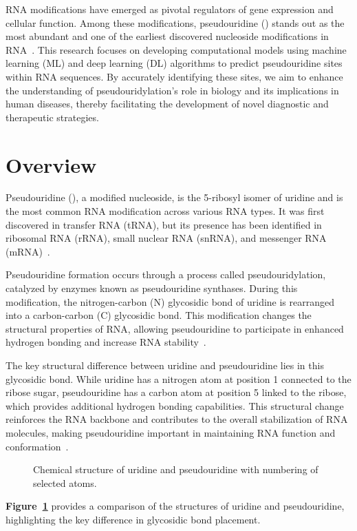 RNA modifications have emerged as pivotal regulators of gene expression and cellular function.
Among these modifications, pseudouridine (\pseudo) stands out as the most abundant and one of the earliest discovered nucleoside modifications in RNA~\cite{charette_pseudouridine_2000}.
This research focuses on developing computational models using machine learning (ML) and deep learning (DL) algorithms to predict pseudouridine sites within RNA sequences.
By accurately identifying these sites, we aim to enhance the understanding of pseudouridylation's role in biology and its implications in human diseases, thereby facilitating the development of novel diagnostic and therapeutic strategies.


\section{Overview}\label{sec:overview}
  Pseudouridine (\pseudo), a modified nucleoside, is the 5-ribosyl isomer of uridine and is the most common RNA modification across various RNA types.
  It was first discovered in transfer RNA (tRNA), but its presence has been identified in ribosomal RNA (rRNA), small nuclear RNA (snRNA), and messenger RNA (mRNA)~\cite{cohn_nucleoside-5-phosphates_1951}.

  Pseudouridine formation occurs through a process called pseudouridylation, catalyzed by enzymes known as pseudouridine synthases.
  During this modification, the nitrogen-carbon (N) glycosidic bond of uridine is rearranged into a carbon-carbon (C) glycosidic bond.
  This modification changes the structural properties of RNA, allowing pseudouridine to participate in enhanced hydrogen bonding and increase RNA stability~\cite{charette_pseudouridine_2000}.

  The key structural difference between uridine and pseudouridine lies in this glycosidic bond.
  While uridine has a nitrogen atom at position 1 connected to the ribose sugar, pseudouridine has a carbon atom at position 5 linked to the ribose, which provides additional hydrogen bonding capabilities.
  This structural change reinforces the RNA backbone and contributes to the overall stabilization of RNA molecules, making pseudouridine important in maintaining RNA function and conformation~\cite{ge_rna_2013}.

  \begin{figure}[h!]
    \centering


    \caption{Chemical structure of uridine and pseudouridine with numbering of selected atoms.}
    \label{fig:structure-pseudouridine}
  \end{figure}

  \textbf{Figure~\ref{fig:structure-pseudouridine}} provides a comparison of the structures of uridine and pseudouridine, highlighting the key difference in glycosidic bond placement.
